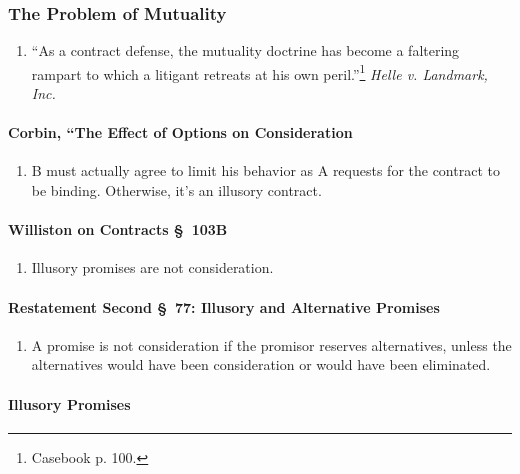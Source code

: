\subsubsection{The Problem of Mutuality}

\begin{enumerate}
    \item ``As a contract defense, the mutuality doctrine has become a 
    faltering rampart to which a litigant retreats at his own 
    peril.''\footnote{Casebook p.  100.} \emph{Helle v. Landmark, Inc.}
\end{enumerate}

\paragraph{Corbin, ``The Effect of Options on Consideration}

\begin{enumerate}
    \item B must actually agree to limit his behavior as A requests for the 
    contract to be binding. Otherwise, it's an illusory contract.
\end{enumerate}

\paragraph{Williston on Contracts \S\ 103B}

\begin{enumerate}
    \item Illusory promises are not consideration.
\end{enumerate}

\paragraph{Restatement Second \S\ 77: Illusory and Alternative Promises}

\begin{enumerate}
    \item A promise is not consideration if the promisor reserves 
    alternatives, unless the alternatives would have been consideration or 
    would have been eliminated.
\end{enumerate}

\paragraph{Illusory Promises}


